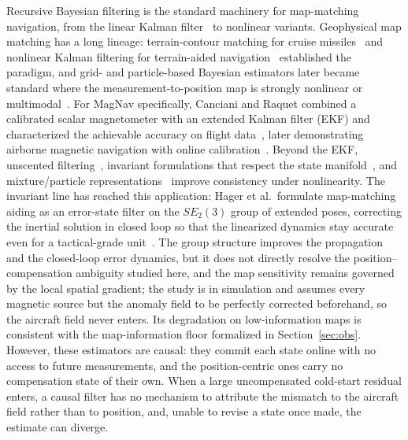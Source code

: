 \documentclass{IEEEtaes}
\begin{document}
Recursive Bayesian filtering is the standard machinery for map-matching
navigation, from the linear Kalman filter~\cite{kalman1960} to nonlinear variants.
Geophysical map matching has a long lineage: terrain-contour matching for cruise
missiles~\cite{golden1980} and nonlinear Kalman filtering for terrain-aided
navigation~\cite{hostetler1983} established the paradigm, and grid- and
particle-based Bayesian estimators later became standard where the
measurement-to-position map is strongly nonlinear or
multimodal~\cite{bergman1999,gustafsson2002,anonsen2006,nordlund2009}. For MagNav
specifically, Canciani and Raquet combined a calibrated scalar magnetometer with an
extended Kalman filter (EKF) and characterized the achievable accuracy on flight
data~\cite{canciani2016,canciani2017}, later demonstrating airborne magnetic
navigation with online calibration~\cite{canciani2020}. Beyond the EKF, unscented
filtering~\cite{julier2004}, invariant formulations that respect the state
manifold~\cite{barrau2017}, and mixture/particle representations~\cite{barshalom2001}
improve consistency under nonlinearity. The invariant line has reached this
application: Hager et al.\ formulate map-matching aiding as an error-state
filter on the $SE_2(3)$ group of extended poses, correcting the inertial
solution in closed loop so that the linearized dynamics stay accurate even for
a tactical-grade unit~\cite{hager2025lie}. The group structure improves the
propagation and the closed-loop error dynamics, but it does not directly
resolve the position--compensation ambiguity studied here, and the map
sensitivity remains governed by the local spatial gradient; the study is in
simulation and assumes every magnetic source but the anomaly field to be
perfectly corrected beforehand, so the aircraft field never enters. Its
degradation on low-information maps is consistent with the map-information
floor formalized in Section~\ref{sec:obs}.
However, these estimators are causal:
they commit each state online with no access to future measurements, and the
position-centric ones carry no compensation state of their own. When a large
uncompensated cold-start residual enters, a causal filter has no mechanism to
attribute the mismatch to the aircraft field rather than to position, and, unable to
revise a state once made, the estimate can diverge.
\end{document}
